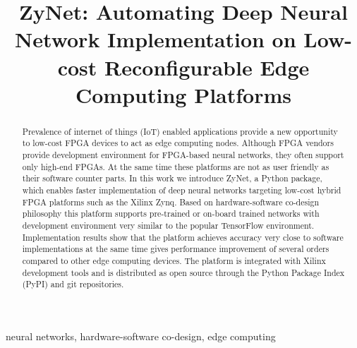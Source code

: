 \documentclass[conference]{IEEEtran}
\begin{document}
\title{ZyNet: Automating Deep Neural Network Implementation on Low-cost Reconfigurable Edge Computing Platforms}

\maketitle

\begin{abstract}
Prevalence of internet of things (IoT) enabled applications provide a new opportunity to low-cost FPGA devices to act as edge computing nodes. Although FPGA vendors provide development environment for FPGA-based neural networks, they often support only high-end FPGAs. At the same time these platforms are not as user friendly as their software counter parts. In this work we introduce ZyNet, a Python package, which enables faster implementation of deep neural networks targeting low-cost hybrid FPGA platforms such as the Xilinx Zynq. Based on hardware-software co-design philosophy this platform supports pre-trained or on-board trained networks with development environment very similar to the popular TensorFlow environment. Implementation results show that the platform achieves accuracy very close to software implementations at the same time gives performance improvement of several orders compared to other edge computing devices. The platform is integrated with Xilinx development tools and is distributed as open source through the Python Package Index (PyPI) and git repositories. 
\end{abstract}

\begin{IEEEkeywords}
neural networks, hardware-software co-design, edge computing
\end{IEEEkeywords}









\end{document}
